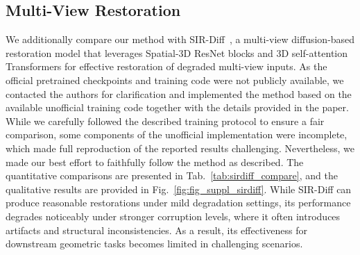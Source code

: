 \documentclass{llmxive}
\begin{document}
\subsection{Multi-View Restoration}
We additionally compare our method with SIR-Diff~\cite{mao2025sir}, a multi-view diffusion-based restoration model that leverages Spatial-3D ResNet blocks and 3D self-attention Transformers for effective restoration of degraded multi-view inputs. As the official pretrained checkpoints and training code were not publicly available, we contacted the authors for clarification and implemented the method based on the available unofficial training code together with the details provided in the paper. While we carefully followed the described training protocol to ensure a fair comparison, some components of the unofficial implementation were incomplete, which made full reproduction of the reported results challenging. Nevertheless, we made our best effort to faithfully follow the method as described. The quantitative comparisons are presented in Tab.~\ref{tab:sirdiff_compare}, and the qualitative results are provided in Fig.~\ref{fig:fig_suppl_sirdiff}. While SIR-Diff can produce reasonable restorations under mild degradation settings, its performance degrades noticeably under stronger corruption levels, where it often introduces artifacts and structural inconsistencies. As a result, its effectiveness for downstream geometric tasks becomes limited in challenging scenarios.
\vspace{-10pt}
\end{document}
